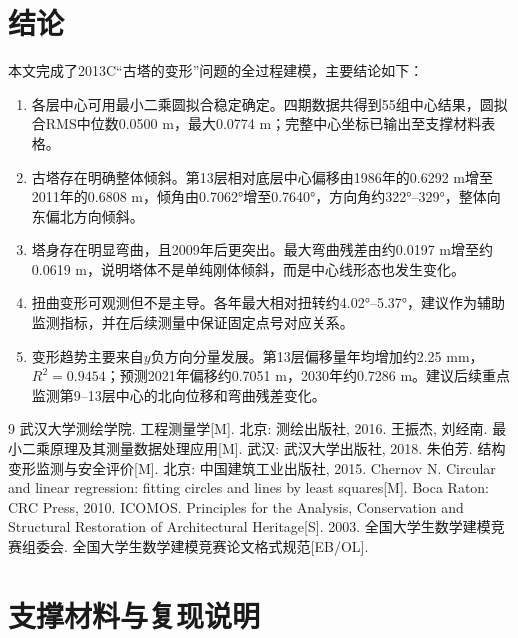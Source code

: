 \documentclass[UTF8,a4paper,12pt]{ctexart}
\begin{document}
\section{结论}
本文完成了2013C“古塔的变形”问题的全过程建模，主要结论如下：
\begin{enumerate}
    \item 各层中心可用最小二乘圆拟合稳定确定。四期数据共得到55组中心结果，圆拟合RMS中位数0.0500 m，最大0.0774 m；完整中心坐标已输出至支撑材料表格。
    \item 古塔存在明确整体倾斜。第13层相对底层中心偏移由1986年的0.6292 m增至2011年的0.6808 m，倾角由0.7062°增至0.7640°，方向角约322°--329°，整体向东偏北方向倾斜。
    \item 塔身存在明显弯曲，且2009年后更突出。最大弯曲残差由约0.0197 m增至约0.0619 m，说明塔体不是单纯刚体倾斜，而是中心线形态也发生变化。
    \item 扭曲变形可观测但不是主导。各年最大相对扭转约4.02°--5.37°，建议作为辅助监测指标，并在后续测量中保证固定点号对应关系。
    \item 变形趋势主要来自$y$负方向分量发展。第13层偏移量年均增加约2.25 mm，$R^2=0.9454$；预测2021年偏移约0.7051 m，2030年约0.7286 m。建议后续重点监测第9--13层中心的北向位移和弯曲残差变化。
\end{enumerate}

\begin{thebibliography}{9}
 武汉大学测绘学院. 工程测量学[M]. 北京: 测绘出版社, 2016.
 王振杰, 刘经南. 最小二乘原理及其测量数据处理应用[M]. 武汉: 武汉大学出版社, 2018.
 朱伯芳. 结构变形监测与安全评价[M]. 北京: 中国建筑工业出版社, 2015.
 Chernov N. Circular and linear regression: fitting circles and lines by least squares[M]. Boca Raton: CRC Press, 2010.
 ICOMOS. Principles for the Analysis, Conservation and Structural Restoration of Architectural Heritage[S]. 2003.
 全国大学生数学建模竞赛组委会. 全国大学生数学建模竞赛论文格式规范[EB/OL].
\end{thebibliography}

\newpage
\appendix
\section{支撑材料与复现说明}
\end{document}
